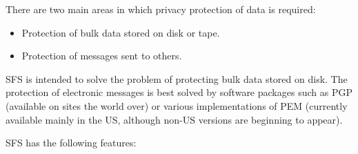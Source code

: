 There are two main areas in which privacy protection of data is required:

\begin{itemize}
  \item Protection of bulk data stored on disk or tape.
  \item Protection of messages sent to others.
\end{itemize}

SFS is intended to solve the problem of protecting bulk data stored on disk.
The protection of electronic messages is best solved by software packages such
as PGP (available on sites the world over) or various implementations of PEM
(currently available mainly in the US, although non-US versions are beginning
to appear).

SFS has the following features:

